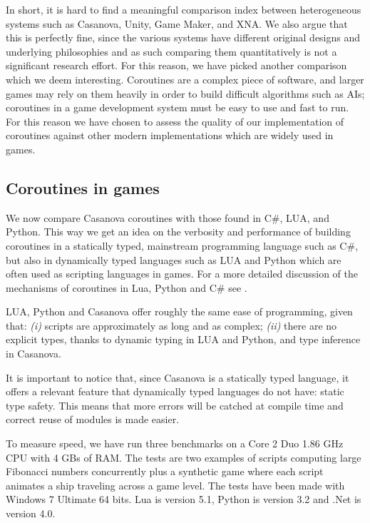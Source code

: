 In short, it is hard to find a meaningful comparison index between heterogeneous systems such as Casanova, Unity, Game Maker, and XNA. We also argue that this is perfectly fine, since the various systems have different original designs and underlying philosophies and as such comparing them quantitatively is not a significant research effort. For this reason, we have picked another comparison which we deem interesting. Coroutines are a complex piece of software, and larger games may rely on them heavily in order to build difficult algorithms such as AIs; coroutines in a game development system must be easy to use and fast to run. For this reason we have chosen to assess the quality of our implementation of coroutines against other modern implementations which are widely used in games.


\subsection{Coroutines in games}
We now compare Casanova coroutines with those found in C\#, LUA, and Python. This way we get an idea on the verbosity and performance of building coroutines in a statically typed, mainstream programming language such as C\#, but also in dynamically typed languages such as LUA and Python which are often used as scripting languages in games. For a more detailed discussion of the mechanisms of coroutines in Lua, Python and C\# see \cite{CHAPTER_9_CSHARP_YIELD, CHAPTER_9_SCRIPTING_LUA, CHAPTER_9_UNITY_YIELD, CHAPTER_9_SCRIPTING_PYTHON}.

LUA, Python and Casanova offer roughly the same ease of programming, given that: \textit{(i)} scripts are approximately as long and as complex; \textit{(ii)} there are no explicit types, thanks to dynamic typing in LUA and Python, and type inference in Casanova.

It is important to notice that, since Casanova is a statically typed language, it offers a relevant feature that dynamically typed languages do not have: static type safety. This means that more errors will be catched at compile time and correct reuse of modules is made easier.

To measure speed, we have run three benchmarks on a Core 2 Duo 1.86 GHz CPU with 4 GBs of RAM. The tests are two examples of scripts computing large Fibonacci numbers concurrently plus a synthetic game where each script animates a ship traveling across a game level. The tests have been made with Windows 7 Ultimate 64 bits. Lua is version 5.1, Python is version 3.2 and .Net is version 4.0.

